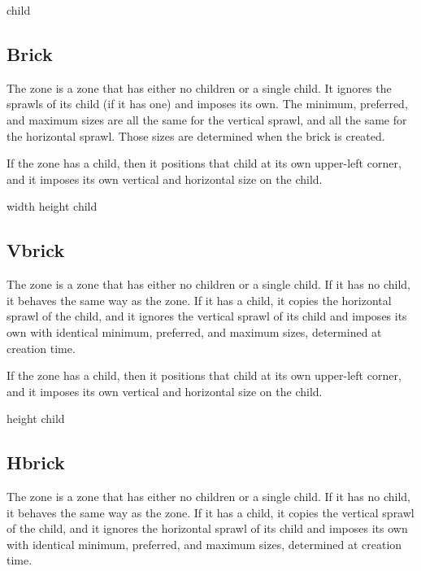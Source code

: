  {\optional child}

\subsection{Brick}
\label{sec-zones-layout-brick}

The  zone is a zone that has either no children or a
single child.  It ignores the sprawls of its child (if it has one) and
imposes its own.  The minimum, preferred, and maximum sizes are all
the same for the vertical sprawl, and all the same for the horizontal
sprawl.  Those sizes are determined when the brick is created.

If the  zone has a child, then it positions that child at
its own upper-left corner, and it imposes its own vertical and
horizontal size on the child.


 {width height \optional child}

\subsection{Vbrick}
\label{sec-zones-layout-vbrick}

The  zone is a zone that has either no children or a
single child.  If it has no child, it behaves the same way as the
 zone.   If it has a
child, it copies the horizontal sprawl of the child, and it ignores
the vertical sprawl of its child and imposes its own with identical
minimum, preferred, and maximum sizes, determined at creation time.

If the  zone has a child, then it positions that child at
its own upper-left corner, and it imposes its own vertical and
horizontal size on the child.


 {height \optional child}

\subsection{Hbrick}
\label{sec-zones-layout-hbrick}

The  zone is a zone that has either no children or a
single child.  If it has no child, it behaves the same way as the
 zone.   If it has a
child, it copies the vertical sprawl of the child, and it ignores
the horizontal sprawl of its child and imposes its own with identical
minimum, preferred, and maximum sizes, determined at creation time.

